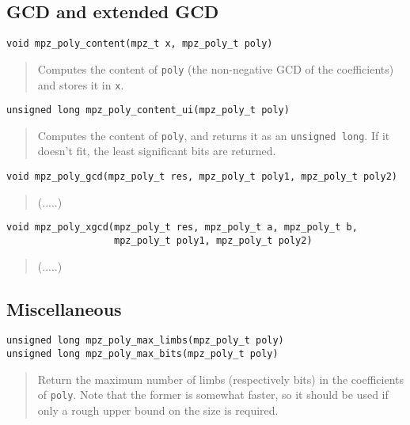 \documentclass[a4paper,10pt]{article}
\newcommand{\code}{\lstinline}
\begin{document}
\subsection{GCD and extended GCD}

\begin{lstlisting}
void mpz_poly_content(mpz_t x, mpz_poly_t poly)
\end{lstlisting}
\begin{quote}
Computes the content of \code{poly} (the non-negative GCD of the coefficients) and stores it in \code{x}.
\end{quote}

\begin{lstlisting}
unsigned long mpz_poly_content_ui(mpz_poly_t poly)
\end{lstlisting}
\begin{quote}
Computes the content of \code{poly}, and returns it as an \code{unsigned long}. If it doesn't fit, the least significant bits are returned.
\end{quote}

\begin{lstlisting}
void mpz_poly_gcd(mpz_poly_t res, mpz_poly_t poly1, mpz_poly_t poly2)
\end{lstlisting}
\begin{quote}
(.....)
\end{quote}

\begin{lstlisting}
void mpz_poly_xgcd(mpz_poly_t res, mpz_poly_t a, mpz_poly_t b,
                   mpz_poly_t poly1, mpz_poly_t poly2)
\end{lstlisting}
\begin{quote}
(.....)
\end{quote}


\subsection{Miscellaneous}

\begin{lstlisting}
unsigned long mpz_poly_max_limbs(mpz_poly_t poly)
unsigned long mpz_poly_max_bits(mpz_poly_t poly)
\end{lstlisting}
\begin{quote}
Return the maximum number of limbs (respectively bits) in the coefficients of \code{poly}. Note that the former is somewhat faster, so it should be used if only a rough upper bound on the size is required.
\end{quote}
\end{document}
